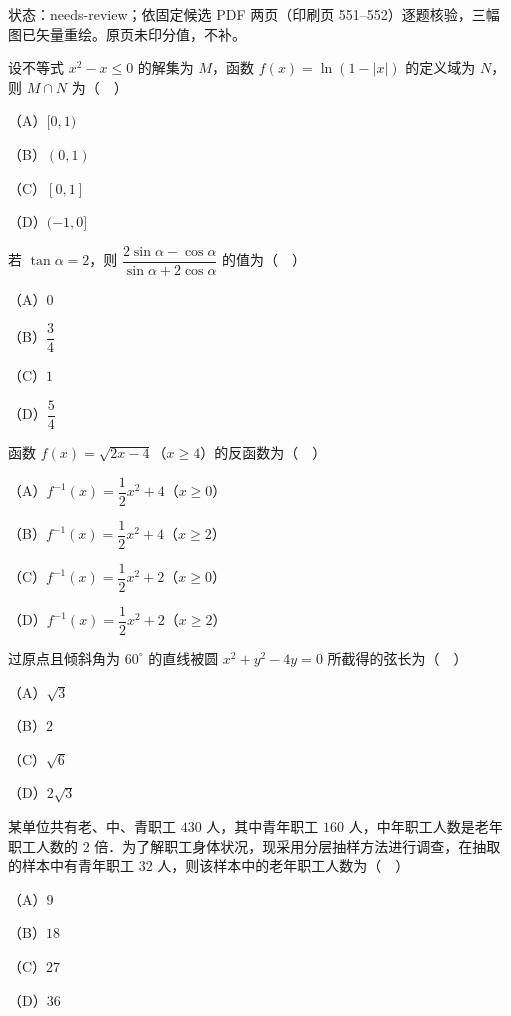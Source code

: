 

状态：needs-review；依固定候选 PDF 两页（印刷页 551–552）逐题核验，三幅图已矢量重绘。原页未印分值，不补。


\begin{question}
设不等式 $x^2-x\leqslant0$ 的解集为 $M$，函数 $f(x)=\ln(1-|x|)$ 的定义域为 $N$，则 $M\cap N$ 为（　）

（A）$[0,1)$

（B）$(0,1)$

（C）$[0,1]$

（D）$(-1,0]$

\end{question}
\begin{question}
若 $\tan\alpha=2$，则 $\dfrac{2\sin\alpha-\cos\alpha}{\sin\alpha+2\cos\alpha}$ 的值为（　）

（A）$0$

（B）$\dfrac34$

（C）$1$

（D）$\dfrac54$

\end{question}
\begin{question}
函数 $f(x)=\sqrt{2x-4}$（$x\geqslant4$）的反函数为（　）

（A）$f^{-1}(x)=\dfrac12x^2+4$（$x\geqslant0$）

（B）$f^{-1}(x)=\dfrac12x^2+4$（$x\geqslant2$）

（C）$f^{-1}(x)=\dfrac12x^2+2$（$x\geqslant0$）

（D）$f^{-1}(x)=\dfrac12x^2+2$（$x\geqslant2$）

\end{question}
\begin{question}
过原点且倾斜角为 $60^\circ$ 的直线被圆 $x^2+y^2-4y=0$ 所截得的弦长为（　）

（A）$\sqrt3$

（B）$2$

（C）$\sqrt6$

（D）$2\sqrt3$

\end{question}
\begin{question}
某单位共有老、中、青职工 $430$ 人，其中青年职工 $160$ 人，中年职工人数是老年职工人数的 $2$ 倍．为了解职工身体状况，现采用分层抽样方法进行调查，在抽取的样本中有青年职工 $32$ 人，则该样本中的老年职工人数为（　）

（A）$9$

（B）$18$

（C）$27$

（D）$36$

\end{question}
